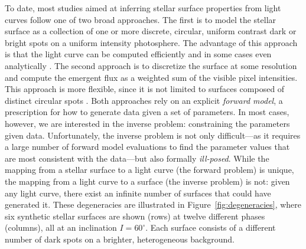 \documentclass[modern]{aastex62}
\begin{document}
To date, most studies aimed at inferring stellar surface
properties from light curves follow one of two broad approaches. The
first is to model the stellar surface as a collection of one or more
discrete, circular, uniform contrast dark or bright spots on a uniform
intensity photosphere.
The advantage of this approach is that
the light curve can be computed efficiently and in some cases even
analytically \citep[e.g.,][]{Davenport2015,Morris2017,Morris2020b}.
%
The second approach is to discretize the surface at some resolution
and compute the emergent flux as a weighted sum of the visible pixel intensities.
This approach is more flexible, since it is not limited to surfaces
composed of distinct circular spots \citep[e.g.,][]{Harmon2000,Roettenbacher2017}.
%
Both approaches rely on an explicit \emph{forward model}, a prescription for
how to generate data given a set of parameters. In most cases, however, we are interested
in the inverse problem: constraining the parameters given data.
%
Unfortunately, the inverse problem is not only difficult---as it requires
a large number of forward model evaluations to find the parameter values
that are most consistent with the
data---but also formally \emph{ill-posed}.
%
While the mapping from a stellar surface to a light curve (the forward
problem) is unique, the mapping from a light curve to a surface
(the inverse problem) is not:
given any light curve, there exist an infinite number of surfaces that
could have generated it. These degeneracies are illustrated in
Figure~\ref{fig:degeneracies}, where six synthetic stellar surfaces
are shown (rows) at twelve different phases (columns), all at an
inclination $I=60^\circ$. Each surface
consists of a different number of dark spots on a brighter, heterogeneous
background.
\end{document}
